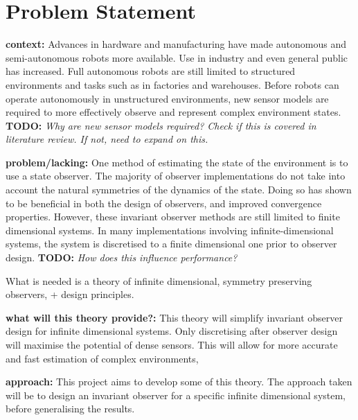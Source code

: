 \section{Problem Statement}

\textbf{context:}
Advances in hardware and manufacturing have made autonomous and semi-autonomous robots more available. Use in industry and even general public has increased. Full autonomous robots are still limited to structured environments and tasks such as in factories and warehouses.
Before robots can operate autonomously in unstructured environments, new sensor models are required to more effectively observe and represent complex environment states. \textbf{TODO:} \textit{Why are new sensor models required? Check if this is covered in literature review. If not, need to expand on this.}

\textbf{problem/lacking:}
One method of estimating the state of the environment is to use a state observer. The majority of observer implementations do not take into account the natural symmetries of the dynamics of the state. Doing so has shown to be beneficial in both the design of observers, and improved convergence properties.
However, these invariant observer methods are still limited to finite dimensional systems. In many implementations involving infinite-dimensional systems, the system is discretised to a finite dimensional one prior to observer design.  \textbf{TODO:} \textit{How does this influence performance?}

What is needed is a theory of infinite dimensional, symmetry preserving observers, + design principles.

\textbf{what will this theory provide?:}
This theory will simplify invariant observer design for infinite dimensional systems. Only discretising after observer design will maximise the potential of dense sensors. This will allow for more accurate and fast estimation of complex environments,

\textbf{approach:}
This project aims to develop some of this theory. The approach taken will be to design an invariant observer for a specific infinite dimensional system, before generalising the results.

